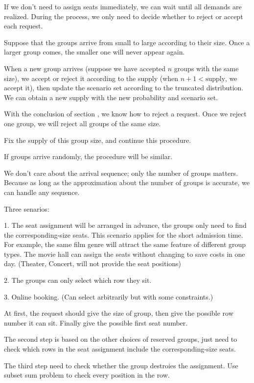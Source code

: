 If we don't need to assign seats immediately, we can wait until all demands are realized. During the process, we only need to decide whether to reject or accept each request.

Suppose that the groups arrive from small to large according to their size. Once a larger group comes, the smaller one will never appear again.

When a new group arrives (suppose we have accepted $n$ groups with the same size), we accept or reject it according to the supply (when $n+1 < \text{supply}$, we accept it), then update the scenario set according to the truncated distribution. We can obtain a new supply with the new probability and scenario set.

With the conclusion of section , we know how to reject a request. Once we reject one group, we will reject all groups of the same size. 

Fix the supply of this group size, and continue this procedure.  

If groups arrive randomly, the procedure will be similar. 

We don't care about the arrival sequence; only the number of groups matters. Because as long as the approximation about the number of groups is accurate, we can handle any sequence.


Three senarios:

1. The seat assignment will be arranged in advance, the groups only need to find the corresponding-size seats. This scenario applies for the short admission time. For example, the same film genre will attract the same feature of different group types. The movie hall can assign the seats without changing to save costs in one day. (Theater, Concert, will not provide the seat positions)

2. The groups can only select which row they sit.

3. Online booking. (Can select arbitrarily but with some constraints.)

At first, the request should give the size of group, then give the possible row number it can sit. Finally give the possible first seat number.

The second step is based on the other choices of reserved groups, just need to check which rows in the seat assignment include the corresponding-size seats.

The third step need to check whether the group destroies the assignment. Use subset sum problem to check every position in the row.

